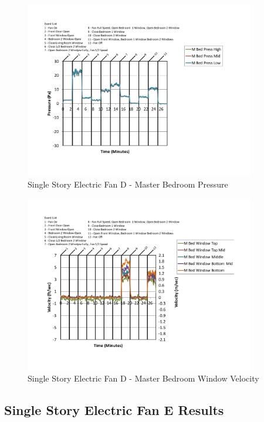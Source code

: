 \documentclass{article}
\begin{document}
\begin{appendices}
	\begin{figure}[H]
		\centering
		\includegraphics[height=3.05in,trim=0.67in 1.1in 0.67in 0.8in,clip=true]{0_Images/Results_Charts/ColdFlow/Single_Story/Electric/D/Master_Bedroom_Pressure.pdf}
		\caption{Single Story Electric Fan D - Master Bedroom Pressure}
	\end{figure}
 

	\begin{figure}[H]
		\centering
		\includegraphics[height=3.05in,trim=0.67in 1.1in 0.67in 0.8in,clip=true]{0_Images/Results_Charts/ColdFlow/Single_Story/Electric/D/Master_Bedroom_Window_Velocity.pdf}
		\caption{Single Story Electric Fan D - Master Bedroom Window Velocity}
	\end{figure}
 
	\clearpage

		\clearpage
\clearpage		\large
\subsection{Single Story Electric Fan E Results} \label{App:Single_StoryElectricFanEResults} 


\end{appendices}
\end{document}
